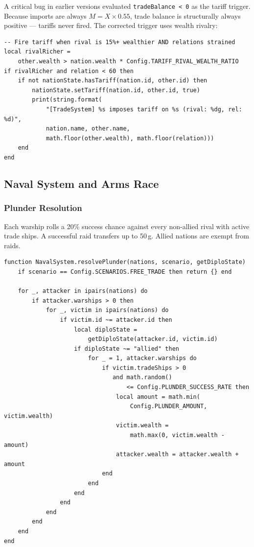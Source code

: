 \documentclass[12pt,a4paper]{article}
\begin{document}
A critical bug in earlier versions evaluated \texttt{tradeBalance < 0} as the tariff trigger. Because imports are always $M = X \times 0.55$, trade balance is structurally always positive --- tariffs never fired. The corrected trigger uses wealth rivalry:

\begin{lstlisting}[caption={Fixed tariff trigger --- TradeSystem.lua}]
-- Fire tariff when rival is 15%+ wealthier AND relations strained
local rivalRicher =
    other.wealth > nation.wealth * Config.TARIFF_RIVAL_WEALTH_RATIO
if rivalRicher and relation < 60 then
    if not nationState.hasTariff(nation.id, other.id) then
        nationState.setTariff(nation.id, other.id, true)
        print(string.format(
            "[TradeSystem] %s imposes tariff on %s (rival: %dg, rel: %d)",
            nation.name, other.name,
            math.floor(other.wealth), math.floor(relation)))
    end
end
\end{lstlisting}

\subsection{Naval System and Arms Race}

\subsubsection{Plunder Resolution}

Each warship rolls a 20\% success chance against every non-allied rival with active trade ships. A successful raid transfers up to 50\,g. Allied nations are exempt from raids.

\begin{lstlisting}[caption={Plunder resolution --- NavalSystem.lua}]
function NavalSystem.resolvePlunder(nations, scenario, getDiploState)
    if scenario == Config.SCENARIOS.FREE_TRADE then return {} end

    for _, attacker in ipairs(nations) do
        if attacker.warships > 0 then
            for _, victim in ipairs(nations) do
                if victim.id ~= attacker.id then
                    local diploState =
                        getDiploState(attacker.id, victim.id)
                    if diploState ~= "allied" then
                        for _ = 1, attacker.warships do
                            if victim.tradeShips > 0
                               and math.random()
                                   <= Config.PLUNDER_SUCCESS_RATE then
                                local amount = math.min(
                                    Config.PLUNDER_AMOUNT, victim.wealth)
                                victim.wealth =
                                    math.max(0, victim.wealth - amount)
                                attacker.wealth = attacker.wealth + amount
                            end
                        end
                    end
                end
            end
        end
    end
end
\end{lstlisting}
\end{document}
